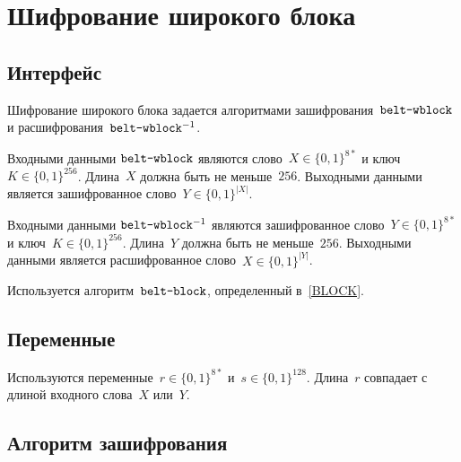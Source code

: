 \section{Шифрование широкого блока}\label{WBLOCK}

\subsection{Интерфейс}\label{WBLOCK.IFace}

Шифрование широкого блока задается алгоритмами зашифрования~$\texttt{belt-wblock}$
и расшифрования~$\texttt{belt-wblock}^{-1}$.

Входными данными $\texttt{belt-wblock}$ являются слово~$X\in\{0,1\}^{8*}$ 
и ключ~$K\in\{0,1\}^{256}$. Длина~$X$ должна быть не меньше~$256$.
%
Выходными данными является зашифрованное слово~$Y\in\{0,1\}^{|X|}$.

Входными данными $\texttt{belt-wblock}^{-1}$ являются зашифрованное слово~$Y\in\{0,1\}^{8*}$ 
и ключ~$K\in\{0,1\}^{256}$. Длина~$Y$ должна быть не меньше~$256$.
%
Выходными данными является расшифрованное слово~$X\in\{0,1\}^{|Y|}$.

Используется алгоритм~$\texttt{belt-block}$, определенный в~\ref{BLOCK}.

\subsection{Переменные}\label{WBLOCK.Vars}

Используются переменные~$r\in\{0,1\}^{8*}$ и~$s\in\{0,1\}^{128}$.
Длина~$r$ совпадает с длиной входного слова~$X$ или~$Y$.

\subsection{Алгоритм зашифрования}\label{WBLOCK.Encr}

